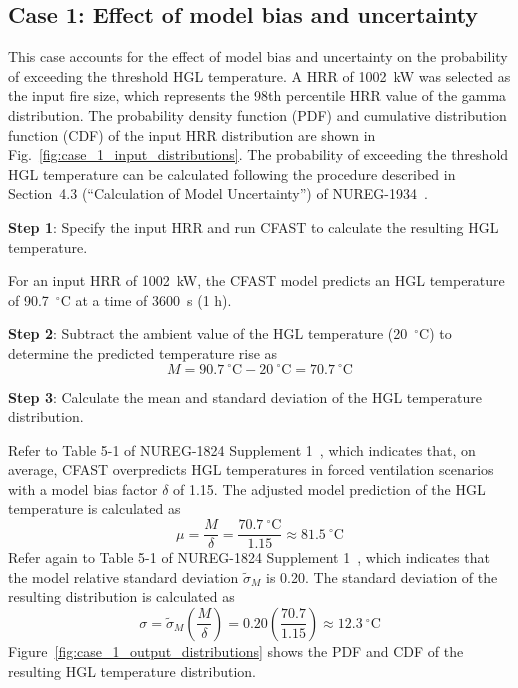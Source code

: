 \documentclass[12pt]{article}
\begin{document}
\clearpage

\subsection{Case 1: Effect of model bias and uncertainty}

This case accounts for the effect of model bias and uncertainty on the probability of exceeding the threshold HGL temperature. A HRR of 1002~kW was selected as the input fire size, which represents the 98th percentile HRR value of the gamma distribution. The probability density function (PDF) and cumulative distribution function (CDF) of the input HRR distribution are shown in Fig.~\ref{fig:case_1_input_distributions}. The probability of exceeding the threshold HGL temperature can be calculated following the procedure described in Section~4.3 (``Calculation of Model Uncertainty'') of NUREG-1934~\cite{NUREG_1934}.

\textbf{Step 1}: Specify the input HRR and run CFAST to calculate the resulting HGL temperature.

For an input HRR of 1002~kW, the CFAST model predicts an HGL temperature of 90.7~$^\circ$C at a time of 3600~s (1 h).

\textbf{Step 2}: Subtract the ambient value of the HGL temperature (20~$^\circ$C) to determine the predicted temperature rise as
\begin{equation}
M = 90.7~^\circ\textrm{C} - 20~^\circ\textrm{C} = 70.7~^\circ\textrm{C}
\end{equation}

\textbf{Step 3}: Calculate the mean and standard deviation of the HGL temperature distribution.

Refer to Table 5-1 of NUREG-1824 Supplement 1~\cite{NUREG_1824_Sup_1}, which indicates that, on average, CFAST overpredicts HGL temperatures in forced ventilation scenarios with a model bias factor $\delta$ of 1.15. The adjusted model prediction of the HGL temperature is calculated as
\begin{equation}
\mu = \frac{M}{\delta} = \frac{70.7~^\circ\textrm{C}}{1.15} \approx 81.5~^\circ\textrm{C}
\end{equation}
Refer again to Table 5-1 of NUREG-1824 Supplement 1~\cite{NUREG_1824_Sup_1}, which indicates that the model relative standard deviation $\widetilde\sigma_M$ is 0.20. The standard deviation of the resulting distribution is calculated as
\begin{equation}
\sigma = \widetilde\sigma_M \left( \frac{M}{\delta} \right) = 0.20 \left( \frac{70.7}{1.15} \right) \approx 12.3~^\circ\textrm{C}
\end{equation}
Figure~\ref{fig:case_1_output_distributions} shows the PDF and CDF of the resulting HGL temperature distribution.
\end{document}
